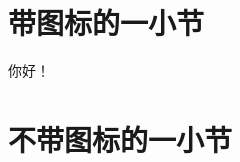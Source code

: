 \documentclass{cv}
\begin{document}
\section[\faTree]{带图标的一小节}

你好！

\section{不带图标的一小节}
\end{document}
